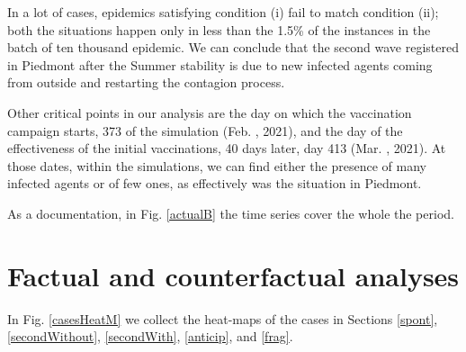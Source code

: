 \documentclass[graybox]{svmult}
\begin{document}
In a lot of cases, epidemics satisfying condition (i) fail to match condition (ii); both the situations happen only in less than the 1.5\% of the instances in the batch of ten thousand epidemic. We can conclude that the second wave registered in Piedmont after the Summer stability is due to new infected agents coming from outside and restarting the contagion process.

Other critical points in our analysis are the day on which the vaccination campaign starts, 373 of the simulation (Feb. , 2021), and the day of the effectiveness of the initial vaccinations, 40 days later, day 413 (Mar. , 2021). At those dates, within the simulations, we can find either the presence of many infected agents or of few ones, as effectively was the situation in Piedmont.

As a documentation, in Fig. \ref{actualB} the time series cover the whole the period.



\section{Factual and counterfactual analyses}
\label{facCounterfac}

In Fig. \ref{casesHeatM} we collect the heat-maps of the cases in Sections \ref{spont}, \ref{secondWithout}, \ref{secondWith}, \ref{anticip}, and \ref{frag}.
\end{document}
